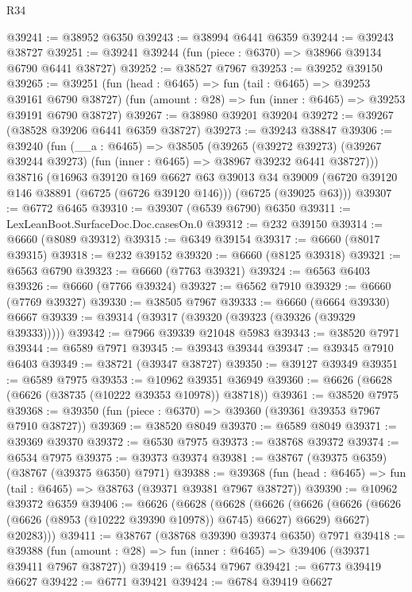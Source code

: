 \begin{lexlean}{R34}
\begin{coremodule}
@39241 := @38952 @6350
@39243 := @38994 @6441 @6359
@39244 := @39243 @38727
@39251 := @39241 @39244 (fun (piece : @6370) => @38966 @39134 @6790 @6441 @38727)
@39252 := @38527 @7967
@39253 := @39252 @39150
@39265 := @39251
    (fun (head : @6465) => fun (tail : @6465) => @39253 @39161 @6790 @38727)
    (fun (amount : @28) => fun (inner : @6465) => @39253 @39191 @6790 @38727)
@39267 := @38980 @39201 @39204
@39272 := @39267 (@38528 @39206 @6441 @6359 @38727)
@39273 := @39243 @38847
@39306 := @39240
    (fun (__a : @6465) =>
    @38505
      (@39265
        (@39272 @39273)
        (@39267 @39244 @39273)
        (fun (inner : @6465) => @38967 @39232 @6441 @38727)))
    @38716
    (@16963
      @39120
      @169
      @6627
      @63
      @39013
      @34
      @39009
      (@6720 @39120 @146 @38891 (@6725 (@6726 @39120 @146)))
      (@6725 (@39025 @63)))
@39307 := @6772 @6465
@39310 := @39307 (@6539 @6790) @6350
@39311 := LexLeanBoot.SurfaceDoc.Doc.casesOn.{0}
@39312 := @232 @39150
@39314 := @6660 (@8089 @39312)
@39315 := @6349 @39154
@39317 := @6660 (@8017 @39315)
@39318 := @232 @39152
@39320 := @6660 (@8125 @39318)
@39321 := @6563 @6790
@39323 := @6660 (@7763 @39321)
@39324 := @6563 @6403
@39326 := @6660 (@7766 @39324)
@39327 := @6562 @7910
@39329 := @6660 (@7769 @39327)
@39330 := @38505 @7967
@39333 := @6660 (@6664 @39330) @6667
@39339 := @39314 (@39317 (@39320 (@39323 (@39326 (@39329 @39333)))))
@39342 := @7966 @39339 @21048 @5983
@39343 := @38520 @7971
@39344 := @6589 @7971
@39345 := @39343 @39344
@39347 := @39345 @7910 @6403
@39349 := @38721 (@39347 @38727)
@39350 := @39127 @39349
@39351 := @6589 @7975
@39353 := @10962 @39351 @36949
@39360 := @6626 (@6628 (@6626 (@38735 (@10222 @39353 @10978)) @38718))
@39361 := @38520 @7975
@39368 := @39350 (fun (piece : @6370) => @39360 (@39361 @39353 @7967 @7910 @38727))
@39369 := @38520 @8049
@39370 := @6589 @8049
@39371 := @39369 @39370
@39372 := @6530 @7975
@39373 := @38768 @39372
@39374 := @6534 @7975
@39375 := @39373 @39374
@39381 := @38767 (@39375 @6359) (@38767 (@39375 @6350) @7971)
@39388 := @39368 (fun (head : @6465) => fun (tail : @6465) => @38763 (@39371 @39381 @7967 @38727))
@39390 := @10962 @39372 @6359
@39406 := @6626
    (@6628
      (@6628
        (@6626
          (@6626 (@6626 (@6626 (@6626 (@8953 (@10222 @39390 @10978)) @6745) @6627) @6629) @6627)
          @20283)))
@39411 := @38767 (@38768 @39390 @39374 @6350) @7971
@39418 := @39388 (fun (amount : @28) => fun (inner : @6465) => @39406 (@39371 @39411 @7967 @38727))
@39419 := @6534 @7967
@39421 := @6773 @39419 @6627
@39422 := @6771 @39421
@39424 := @6784 @39419 @6627

\end{coremodule}
\end{lexlean}
